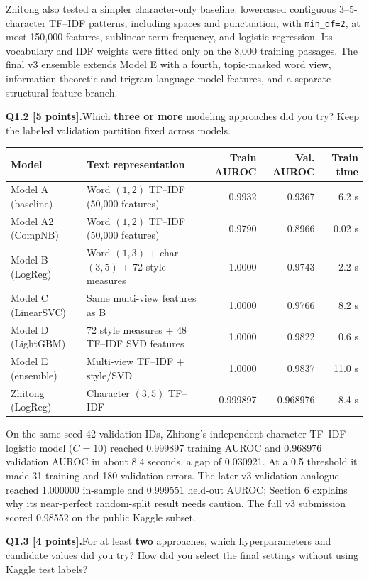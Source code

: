 \documentclass[11pt,letterpaper]{article}
\newcommand{\question}[2]{\needspace{4\baselineskip}\par\addvspace{0.45em}\noindent\textbf{#1}\quad #2\par\nobreak\vspace{0.1em}}
\begin{document}
Zhitong also tested a simpler character-only baseline: lowercased contiguous 3--5-character TF--IDF patterns, including spaces and punctuation, with \texttt{min\_df=2}, at most 150,000 features, sublinear term frequency, and logistic regression. Its vocabulary and IDF weights were fitted only on the 8,000 training passages. The final v3 ensemble extends Model E with a fourth, topic-masked word view, information-theoretic and trigram-language-model features, and a separate structural-feature branch.
\question{Q1.2 [5 points].}{Which \textbf{three or more} modeling approaches did you try? Keep the labeled validation partition fixed across models.}
\begin{tabularx}{\linewidth}{@{}p{1.24in}Yrrr@{}}\toprule
Model & Text representation & Train AUROC & Val. AUROC & Train time \\ \midrule
Model A (baseline) & Word $(1,2)$ TF--IDF (50,000 features) & 0.9932 & 0.9367 & 6.2 s \\
Model A2 (CompNB) & Word $(1,2)$ TF--IDF (50,000 features) & 0.9790 & 0.8966 & 0.02 s \\
Model B (LogReg) & Word $(1,3)$ + char $(3,5)$ + 72 style measures & 1.0000 & 0.9743 & 2.2 s \\
Model C (LinearSVC) & Same multi-view features as B & 1.0000 & 0.9766 & 8.2 s \\
Model D (LightGBM) & 72 style measures + 48 TF--IDF SVD features & 1.0000 & 0.9822 & 0.6 s \\
Model E (ensemble) & Multi-view TF--IDF + style/SVD & 1.0000 & 0.9837 & 11.0 s \\
Zhitong (LogReg) & Character $(3,5)$ TF--IDF & 0.999897 & 0.968976 & 8.4 s \\
\bottomrule\end{tabularx}
On the same seed-42 validation IDs, Zhitong's independent character TF--IDF logistic model ($C=10$) reached 0.999897 training AUROC and 0.968976 validation AUROC in about 8.4 seconds, a gap of 0.030921. At a 0.5 threshold it made 31 training and 180 validation errors. The later v3 validation analogue reached 1.000000 in-sample and 0.999551 held-out AUROC; Section 6 explains why its near-perfect random-split result needs caution. The full v3 submission scored 0.98552 on the public Kaggle subset.
\question{Q1.3 [4 points].}{For at least \textbf{two} approaches, which hyperparameters and candidate values did you try? How did you select the final settings without using Kaggle test labels?}
\end{document}
